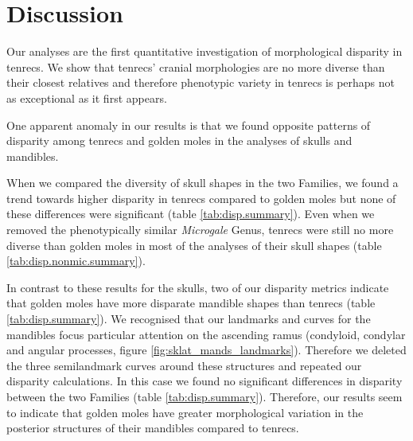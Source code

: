 \documentclass[12pt,a4paper]{article}
\begin{document}
\section{Discussion} 


	Our analyses are the first quantitative investigation of morphological disparity in tenrecs. We show that tenrecs' cranial morphologies are no more diverse than their closest relatives and therefore phenotypic variety in tenrecs is perhaps not as exceptional as it first appears.
	
	One apparent anomaly in our results is that we found opposite patterns of disparity among tenrecs and golden moles in the analyses of skulls and mandibles.
	
	When we compared the diversity of skull shapes in the two Families, we found a trend towards higher disparity in tenrecs compared to golden moles but none of these differences were significant (table \ref{tab:disp.summary}). Even when we removed the phenotypically similar \textit{Microgale} Genus, tenrecs were still no more diverse than golden moles in most of the analyses of their skull shapes (table \ref{tab:disp.nonmic.summary}). 
	
	In contrast to these results for the skulls, two of our disparity metrics indicate that golden moles have more disparate mandible shapes than tenrecs (table \ref{tab:disp.summary}).
	We recognised that our landmarks and curves for the mandibles focus particular attention on the ascending ramus (condyloid, condylar and angular processes, figure \ref{fig:sklat_mands_landmarks}). Therefore we deleted the three semilandmark curves around these structures and repeated our disparity calculations. In this case we found no significant differences in disparity between the two Families (table \ref{tab:disp.summary}). Therefore, our results seem to indicate that golden moles have greater morphological variation in the posterior structures of their mandibles compared to tenrecs.
		
\end{document}
